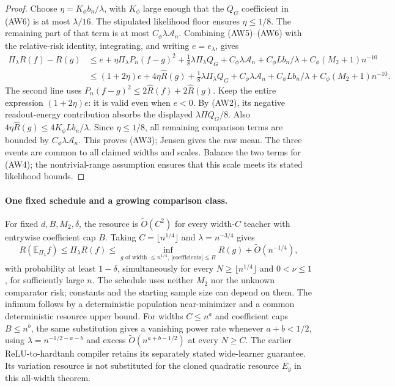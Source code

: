 \begin{proof}
Choose $\eta=K_\phi b_n/\lambda$, with $K_\phi$ large enough that
the $Q_G$ coefficient in (AW6) is at most $\lambda/16$.
The stipulated likelihood floor ensures $\eta\le1/8$.
The remaining part of that term is at most
$C_\phi\lambda\mathcal A_n$.
Combining (AW5)--(AW6) with the relative-risk identity, integrating,
and writing $e=e_\lambda$, gives
\begin{align*}
 \Pi_\lambda R(f)-R(g)
 &\le e+\eta\Pi_\lambda P_n(f-g)^2
          +\tfrac18\lambda\Pi_\lambda Q_G
          +C_\phi\lambda\mathcal A_n+C_\phi Lb_n/\lambda
          +C_\phi(M_2+1)n^{-10}\\
 &\le(1+2\eta)e+4\eta\widehat R(g)
          +\tfrac18\lambda\Pi_\lambda Q_G
          +C_\phi\lambda\mathcal A_n+C_\phi Lb_n/\lambda
          +C_\phi(M_2+1)n^{-10}.
\end{align*}
The second line uses
$P_n(f-g)^2\le2\widehat R(f)+2\widehat R(g)$.
Keep the entire expression $(1+2\eta)e$: it is valid even when $e<0$.
By (AW2), its negative readout-energy contribution absorbs the displayed
$\lambda\Pi Q_G/8$. Also
$4\eta\widehat R(g)\le4K_\phi Lb_n/\lambda$.
Since $\eta\le1/8$, all remaining comparison terms are bounded by
$C_\phi\lambda\mathcal A_n$. This proves (AW3); Jensen gives the raw
mean. The three events are common to all claimed widths and scales.
Balance the two terms for (AW4); the nontrivial-range assumption ensures
that this scale meets its stated likelihood bounds.
\end{proof}

\paragraph{One fixed schedule and a growing comparison class.}
For fixed $d,B,M_2,\delta$, the resource is
$\widetilde O(C^2)$ for every width-$C$ teacher with entrywise coefficient
cap $B$. Taking $C=\lfloor n^{1/4}\rfloor$ and $\lambda=n^{-3/4}$ gives
\[
 R(\mathbb E_{\Pi_\lambda}f)\le\Pi_\lambda R(f)
 \le\inf_{g\text{ of width }\le n^{1/4},\,|\text{coefficients}|\le B}
                  R(g)+\widetilde O(n^{-1/4}),           \tag{AW7}
\]
with probability at least $1-\delta$, simultaneously for every
$N\ge\lfloor n^{1/4}\rfloor$ and $0<\nu\le1$, for sufficiently large
$n$. The schedule uses neither $M_2$ nor the unknown comparator risk;
constants and the starting sample size can depend on them.
The infimum follows by a deterministic population near-minimizer and
a common deterministic resource upper bound.
For widths $C\le n^a$ and coefficient caps $B\le n^b$, the same
substitution gives a vanishing power rate whenever $a+b<1/2$,
using $\lambda=n^{-1/2-a-b}$ and excess
$\widetilde O(n^{a+b-1/2})$ at every $N\ge C$.
The earlier ReLU-to-hardtanh compiler retains its separately stated
wide-learner guarantee. Its variation resource is not substituted for
the cloned quadratic resource $E_g$ in this all-width theorem.
